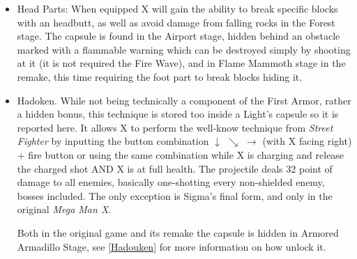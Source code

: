 \begin{itemize}
	\item Head Parts: When equipped X will gain the ability to break specific blocks with an headbutt, as well as avoid damage from falling rocks in the Forest stage. The capsule is found in the Airport stage, hidden behind an obstacle marked with a flammable warning which can be destroyed simply by shooting at it (it is not required the Fire Wave), and in Flame Mammoth stage in the remake, this time requiring the foot part to break blocks hiding it.
	
	\item Hadoken. While not being technically a component of the First Armor, rather a hidden bonus, this technique is stored too inside a Light's capsule so it is reported here. It allows X to perform the well-know technique from \textit{Street Fighter} by inputting the button combination $\downarrow$ $\searrow$ $\rightarrow$ (with X facing right) + fire button or using the same combination while X is charging and release the charged shot\cite{RTA_wiki:X1}  AND X is at full health. The projectile deals 32 point of damage\cite{wiki:Hadoken} to all enemies, basically one-shotting every non-shielded enemy, bosses included. The only exception is Sigma's final form, and only in the original \textit{Mega Man X}. 
	
	Both in the original game and its remake the capsule is hidden in Armored Armadillo Stage, see \ref{Hadouken} for more information on how unlock it.
\end{itemize}

